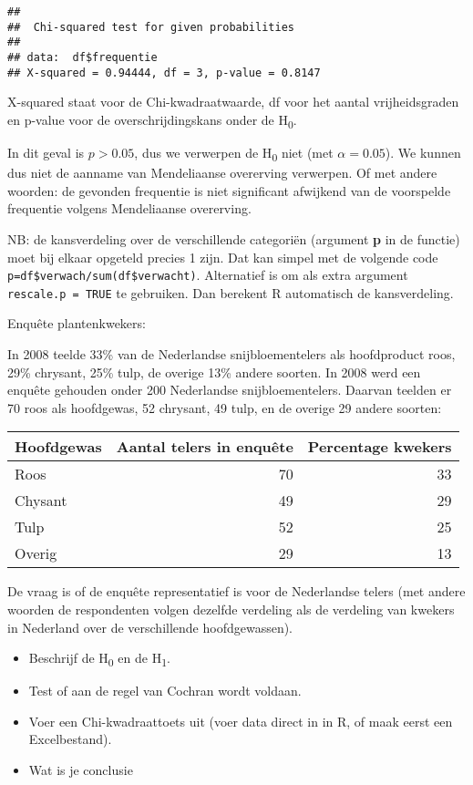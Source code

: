\documentclass[]{book}
\providecommand{\tightlist}{%
  \setlength{\itemsep}{0pt}\setlength{\parskip}{0pt}}
\theoremstyle{definition}
\theoremstyle{definition}
\theoremstyle{definition}
\theoremstyle{remark}
\let\BeginKnitrBlock\begin \let\EndKnitrBlock\end
\begin{document}
\begin{verbatim}
## 
##  Chi-squared test for given probabilities
## 
## data:  df$frequentie
## X-squared = 0.94444, df = 3, p-value = 0.8147
\end{verbatim}

X-squared staat voor de Chi-kwadraatwaarde, df voor het aantal
vrijheidsgraden en p-value voor de overschrijdingskans onder de
H\textsubscript{0}.

In dit geval is \(p>0.05\), dus we verwerpen de H\textsubscript{0} niet
(met \(\alpha=0.05\)). We kunnen dus niet de aanname van Mendeliaanse
overerving verwerpen. Of met andere woorden: de gevonden frequentie is
niet significant afwijkend van de voorspelde frequentie volgens
Mendeliaanse overerving.

NB: de kansverdeling over de verschillende categoriën (argument
\textbf{p} in de functie) moet bij elkaar opgeteld precies 1 zijn. Dat
kan simpel met de volgende code
\texttt{p=df\$verwach/sum(df\$verwacht)}. Alternatief is om als extra
argument \texttt{rescale.p\ =\ TRUE} te gebruiken. Dan berekent R
automatisch de kansverdeling.

\BeginKnitrBlock{exercise}
\protect\hypertarget{exr:plantenkwekers}{}{\label{exr:plantenkwekers}
}Enquête plantenkwekers:

In 2008 teelde 33\% van de Nederlandse snijbloementelers als
hoofdproduct roos, 29\% chrysant, 25\% tulp, de overige 13\% andere
soorten. In 2008 werd een enquête gehouden onder 200 Nederlandse
snijbloementelers. Daarvan teelden er 70 roos als hoofdgewas, 52
chrysant, 49 tulp, en de overige 29 andere soorten:
\EndKnitrBlock{exercise}

\begin{tabular}{l|r|r}
\hline
Hoofdgewas & Aantal telers in enquête & Percentage kwekers\\
\hline
Roos & 70 & 33\\
\hline
Chysant & 49 & 29\\
\hline
Tulp & 52 & 25\\
\hline
Overig & 29 & 13\\
\hline
\end{tabular}

De vraag is of de enquête representatief is voor de Nederlandse telers
(met andere woorden de respondenten volgen dezelfde verdeling als de
verdeling van kwekers in Nederland over de verschillende hoofdgewassen).

\begin{itemize}
\tightlist
\item
  Beschrijf de H\textsubscript{0} en de H\textsubscript{1}.
\item
  Test of aan de regel van Cochran wordt voldaan.
\item
  Voer een Chi-kwadraattoets uit (voer data direct in in R, of maak
  eerst een Excelbestand).
\item
  Wat is je conclusie
\end{itemize}
\end{document}
